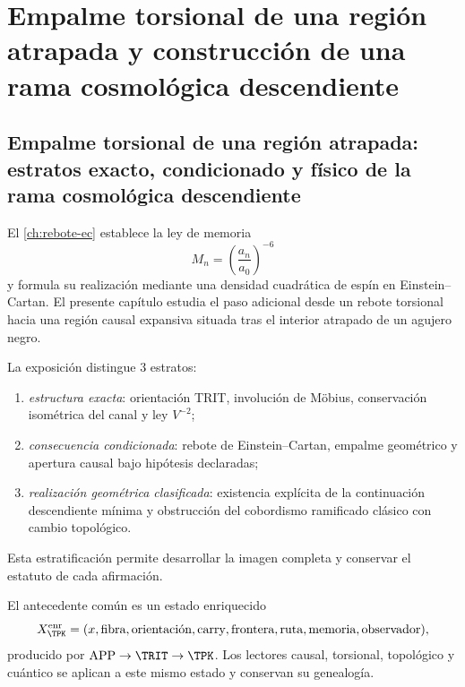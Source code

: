 \chapter{Empalme torsional de una región atrapada y construcción de una rama cosmológica descendiente}
\label{chap:universo-descendiente}

\section{Empalme torsional de una región atrapada: estratos exacto, condicionado y físico de la rama cosmológica descendiente}

El \cref{ch:rebote-ec} establece la ley de memoria
\begin{equation}
 M_n=\left(\frac{a_n}{a_0}\right)^{-6}
 \label{eq:descendant-memory-law}
\end{equation}
y formula su realizaci\'on mediante una densidad cuadr\'atica de esp\'in en
Einstein--Cartan. El presente cap\'itulo estudia el paso adicional desde un
rebote torsional hacia una regi\'on causal expansiva situada tras el interior
atrapado de un agujero negro.

La exposici\'on distingue \(3\) estratos:
\begin{enumerate}
 \item \emph{estructura exacta}: orientaci\'on TRIT, involuci\'on de M\"obius,
       conservaci\'on isom\'etrica del canal y ley \(V^{-2}\);
 \item \emph{consecuencia condicionada}: rebote de Einstein--Cartan,
       empalme geom\'etrico y apertura causal bajo hip\'otesis declaradas;
 \item \emph{realizaci\'on geom\'etrica clasificada}: existencia explícita de
       la continuaci\'on descendiente m\'inima y obstrucci\'on del cobordismo
       ramificado cl\'asico con cambio topol\'ogico.
\end{enumerate}
Esta estratificaci\'on permite desarrollar la imagen completa y conservar el
estatuto de cada afirmaci\'on.

El antecedente com\'un es un estado enriquecido
\begin{equation}
 X^{\rm enr}_{\TPK}
 =(x,\text{fibra},\text{orientaci\'on},\text{carry},
   \text{frontera},\text{ruta},\text{memoria},\text{observador}),
 \label{eq:descendant-enriched-state}
\end{equation}
producido por \(\mathrm{APP}\to\TRIT\to\TPK\). Los lectores causal,
torsional, topol\'ogico y cu\'antico se aplican a este mismo estado y
conservan su genealog\'ia.

